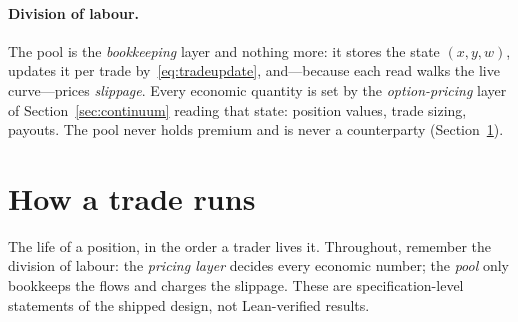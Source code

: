 \documentclass[runningheads]{llncs}
\begin{document}
\paragraph{Division of labour.}
The pool is the \emph{bookkeeping} layer and nothing more: it stores the
state $(x,y,w)$, updates it per trade by~\eqref{eq:tradeupdate}, and---because
each read walks the live curve---prices \emph{slippage}. Every economic
quantity is set by the \emph{option-pricing} layer of
Section~\ref{sec:continuum} reading that state: position values, trade
sizing, payouts. The pool never holds premium and is never a counterparty
(Section~\ref{sec:exec}).


\section{How a trade runs}\label{sec:exec}
The life of a position, in the order a trader lives it. Throughout, remember
the division of labour: the \emph{pricing layer} decides every economic
number; the \emph{pool} only bookkeeps the flows and charges the slippage.
These are specification-level statements of the shipped design, not
Lean-verified results.
\end{document}
